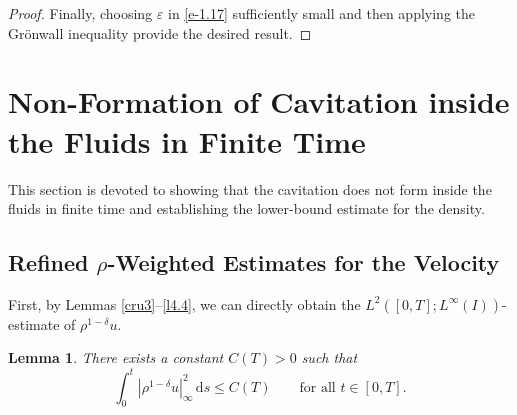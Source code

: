 \documentclass[11pt,reqno]{amsart}
\newtheorem{lem}{Lemma}[section]
\numberwithin{rk}{section}
\numberwithin{prop}{section}
\numberwithin{mydef}{section}
\numberwithin{lem}{section}
\numberwithin{equation}{section}
\numberwithin{thm}{section}
\begin{document}
\begin{proof}
Finally, choosing $\varepsilon$ in \eqref{e-1.17} sufficiently small and then applying the Gr\"onwall inequality provide the desired result.
\end{proof}



\section{Non-Formation of Cavitation
inside the Fluids  in Finite Time}\label{section-nonformation}

This section is devoted to showing that the cavitation does not form inside the fluids in finite 
time and establishing the lower-bound estimate for the density.  



\subsection{Refined $\rho$-Weighted Estimates for the Velocity}\label{sub-refine}

First, by Lemmas \ref{cru3}--\ref{l4.4}, we can directly obtain the $L^2([0,T];L^\infty(I))$-estimate of $\rho^{1-\delta}u$. 
\begin{lem}\label{cru4}
There exists a constant $C(T)>0$ such that
\begin{equation*}
\int_0^t |\rho^{1-\delta}u|_{\infty}^2\, \mathrm{d}s\leq C(T) \qquad\text{for all $t\in [0,T]$}.
\end{equation*}    
\end{lem}
\end{document}
